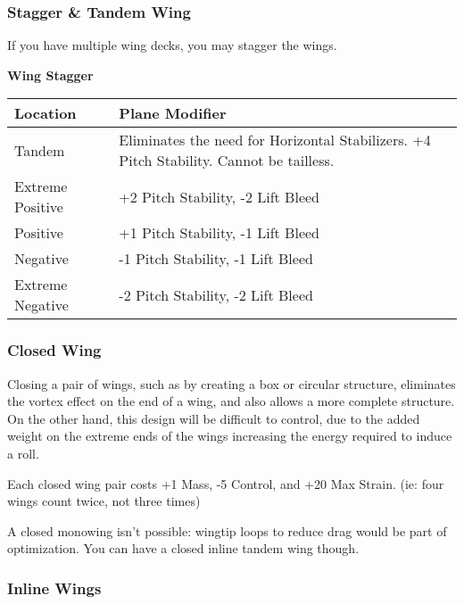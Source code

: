 \documentclass{article}
\begin{document}
\subsubsection{Stagger \& Tandem Wing}
\label{_Stagger \& Tandem Wing}

If you have multiple wing decks, you may stagger the wings.

\textbf{Wing Stagger}

\begin{tabular}{|l|l|}
  \hline
  Location         & Plane Modifier                                           \\\hline
  Tandem           & Eliminates the need for Horizontal Stabilizers. +4 Pitch
  Stability. Cannot be tailless.                                              \\\hline
  Extreme Positive & +2 Pitch Stability, -2 Lift Bleed                        \\\hline
  Positive         & +1 Pitch Stability, -1 Lift Bleed                        \\\hline
  Negative         & -1 Pitch Stability, -1 Lift Bleed                        \\\hline
  Extreme Negative & -2 Pitch Stability, -2 Lift Bleed                        \\\hline
\end{tabular}

\subsubsection{Closed Wing}
\label{_Closed Wing}

Closing a pair of wings, such as by creating a box or circular
structure, eliminates the vortex effect on the end of a wing, and also
allows a more complete structure. On the other hand, this design will be
difficult to control, due to the added weight on the extreme ends of the
wings increasing the energy required to induce a roll.

Each closed wing pair costs +1 Mass, -5 Control, and +20 Max Strain.
(ie: four wings count twice, not three times)

A closed monowing isn't possible: wingtip loops to reduce drag would be
part of optimization. You can have a closed inline tandem wing though.

\subsubsection{Inline Wings}
\label{_Inline Wings}
\end{document}
